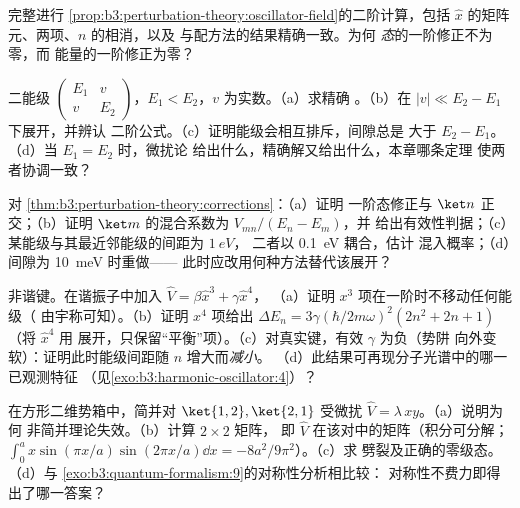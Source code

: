 \begin{exercise}[$\star$]\label{exo:b3:perturbation-theory:2}
完整进行
\cref{prop:b3:perturbation-theory:oscillator-field}的二阶计算，包括
$\hat x$ 的矩阵元、两项、$n$ 的相消，以及
与配方法的结果精确一致。为何
\emph{态}的一阶修正不为零，而
能量的一阶修正为零？
\end{exercise}

\begin{exercise}[$\star$]\label{exo:b3:perturbation-theory:3}
二能级 $\begin{pmatrix}E_1 & v\\ v &
E_2\end{pmatrix}$，$E_1 < E_2$，$v$ 为实数。（a）求精确
。（b）在 $|v| \ll E_2 - E_1$ 下展开，并辨认
二阶公式。（c）证明能级会相互排斥，间隙总是
大于 $E_2 - E_1$。（d）当 $E_1 = E_2$ 时，微扰论
给出什么，精确解又给出什么，本章哪条定理
使两者协调一致？
\end{exercise}

\begin{exercise}[$\star$]\label{exo:b3:perturbation-theory:4}
对 \cref{thm:b3:perturbation-theory:corrections}：（a）证明
一阶态修正与 $\ket n$ 正交；（b）证明
$\ket m$ 的混合系数为 $V_{mn}/(E_n - E_m)$，并
给出有效性判据；（c）某能级与其最近邻能级的间距为 $\qty{1}{eV}$，
二者以 \qty{0.1}{eV} 耦合，估计
混入概率；（d）间隙为 \qty{10}{meV} 时重做——
此时应改用何种方法替代该展开？
\end{exercise}

\begin{exercise}[$\star\star$]\label{exo:b3:perturbation-theory:5}
非谐键。在谐振子中加入 $\hat V = \beta\hat x^3 + \gamma\hat x^4$，
（a）证明 $x^3$ 项在一阶时不移动任何能级（
由宇称可知）。（b）证明 $x^4$ 项给出 $\Delta E_n =
3\gamma(\hbar/2m\omega)^2(2n^2 + 2n + 1)$（将 $\hat x^4$ 用
展开，只保留“平衡”项）。（c）对真实键，有效 $\gamma$ 为负（势阱
向外变软）：证明此时能级间距随
$n$ 增大而\emph{减小}。
（d）此结果可再现分子光谱中的哪一已观测特征
（见\cref{exo:b3:harmonic-oscillator:4}）？
\end{exercise}

\begin{exercise}[$\star\star$]\label{exo:b3:perturbation-theory:6}
在方形二维势箱中，简并对 $\ket{1,2},
\ket{2,1}$ 受微扰 $\hat V = \lambda\,xy$。（a）说明为何
非简并理论失效。（b）计算 $2\times2$ 矩阵，
即 $\hat V$ 在该对中的矩阵（积分可分解；$\int_0^a
x\sin(\pi x/a)\sin(2\pi x/a)\dd x = -8a^2/9\pi^2$）。（c）求
劈裂及正确的零级态。（d）与
\cref{exo:b3:quantum-formalism:9}的对称性分析相比较：
对称性不费力即得出了哪一答案？
\end{exercise}

